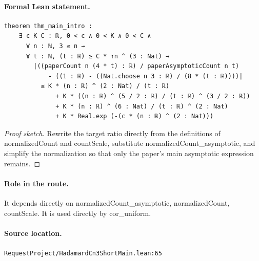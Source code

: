 \medskip
\paragraph{Formal Lean statement.}
\begin{verbatim}
theorem thm_main_intro :
    ∃ c K C : ℝ, 0 < c ∧ 0 < K ∧ 0 < C ∧
      ∀ n : ℕ, 3 ≤ n →
      ∀ t : ℕ, (t : ℝ) ≥ C * ↑n ^ (3 : Nat) →
        |((paperCount n (4 * t) : ℝ) / paperAsymptoticCount n t)
            - ((1 : ℝ) - ((Nat.choose n 3 : ℝ) / (8 * (t : ℝ))))|
          ≤ K * (n : ℝ) ^ (2 : Nat) / (t : ℝ)
              + K * ((n : ℝ) ^ (5 / 2 : ℝ) / (t : ℝ) ^ (3 / 2 : ℝ))
              + K * (n : ℝ) ^ (6 : Nat) / (t : ℝ) ^ (2 : Nat)
              + K * Real.exp (-(c * (n : ℝ) ^ (2 : Nat)))
\end{verbatim}
\begin{proof}[Proof sketch]
Rewrite the target ratio directly from the definitions of normalizedCount and countScale, substitute normalizedCount\_asymptotic, and simplify the normalization so that only the paper's main asymptotic expression remains.
\end{proof}
\paragraph{Role in the route.}
It depends directly on normalizedCount\_asymptotic, normalizedCount, countScale. It is used directly by cor\_uniform.
\paragraph{Source location.}
\texttt{RequestProject/HadamardCn3ShortMain.lean:65}
\medskip
